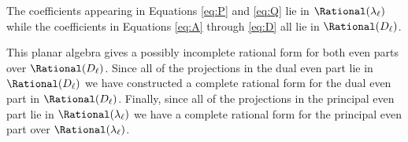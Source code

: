 The coefficients appearing in Equations \eqref{eq:P} and \eqref{eq:Q} lie in $\Rational(\lambda_\ell)$ while the coefficients in Equations \eqref{eq:A} through \eqref{eq:D} all lie in $\Rational(D_\ell)$.

This planar algebra gives a possibly incomplete rational form for both even parts over $\Rational(D_\ell)$.  Since all of the projections in the dual even part lie in $\Rational(D_\ell)$ we have constructed a complete rational form for the dual even part in $\Rational(D_\ell)$.  Finally, since all of the projections in the principal even part lie in $\Rational(\lambda_\ell)$ we have a complete rational form for the principal even part over $\Rational(\lambda_\ell)$.
